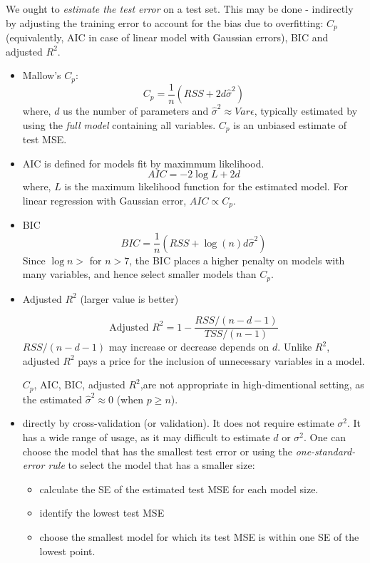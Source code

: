 \documentclass[
  letterpaper,
  DIV=11,
  numbers=noendperiod]{scrreprt}
\providecommand{\tightlist}{%
  \setlength{\itemsep}{0pt}\setlength{\parskip}{0pt}}\usepackage{longtable,booktabs,array}
\begin{document}
We ought to \emph{estimate the test error} on a test set. This may be
done - indirectly by adjusting the training error to account for the
bias due to overfitting: \(C_p\) (equivalently, AIC in case of linear
model with Gaussian errors), BIC and adjusted \(R^2\).

\begin{itemize}
\item
  Mallow's \(C_p\): \[
    C_p =\frac{1}{n}(RSS+2d\hat{\sigma}^2)
    \] where, \(d\) us the number of parameters and
  \(\hat{\sigma}^2 \approx Var{\epsilon}\), typically estimated by using
  the \emph{full model} containing all variables. \(C_p\) is an unbiased
  estimate of test MSE.
\item
  AIC is defined for models fit by maximmum likelihood. \[
    AIC = -2\log L + 2d
    \] where, \(L\) is the maximum likelihood function for the estimated
  model. For linear regression with Gaussian error, \(AIC\propto C_p\).
\item
  BIC \[
    BIC = \frac{1}{n}( RSS + \log (n)d \hat{\sigma}^2 )
    \] Since \(\log n>\) for \(n>7\), the BIC places a higher penalty on
  models with many variables, and hence select smaller models than
  \(C_p\).
\item
  Adjusted \(R^2\) (larger value is better)

  \[
  \text{Adjusted }R^2=1-\frac{RSS/(n-d-1)}{TSS/(n-1)}
  \] \(RSS/(n-d-1)\) may increase or decrease depends on \(d\). Unlike
  \(R^2\), adjusted \(R^2\) pays a price for the inclusion of
  unnecessary variables in a model.

  \(C_p\), AIC, BIC, adjusted \(R^2\),are not appropriate in
  high-dimentional setting, as the estimated
  \(\hat{\sigma}^2 \approx 0\) (when \(p\ge n\)).
\item
  directly by cross-validation (or validation). It does not require
  estimate \(\sigma^2\). It has a wide range of usage, as it may
  difficult to estimate \(d\) or \(\sigma^2\). One can choose the model
  that has the smallest test error or using the \emph{one-standard-error
  rule} to select the model that has a smaller size:

  \begin{itemize}
  \tightlist
  \item
    calculate the SE of the estimated test MSE for each model size.
  \item
    identify the lowest test MSE
  \item
    choose the smallest model for which its test MSE is within one SE of
    the lowest point.
  \end{itemize}
\end{itemize}
\end{document}
